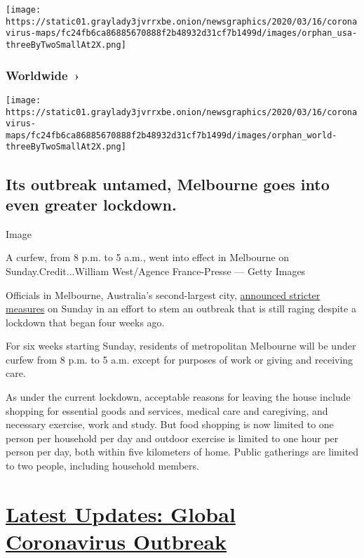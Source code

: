 \texttt{[image: https://static01.graylady3jvrrxbe.onion/newsgraphics/2020/03/16/coronavirus-maps/fc24fb6ca86885670888f2b48932d31cf7b1499d/images/orphan\_usa-threeByTwoSmallAt2X.png]}

\href{https://www.nytimes3xbfgragh.onion/interactive/2020/world/coronavirus-maps.html}{}

\hypertarget{worldwide-}{%
\subsubsection{Worldwide~›}\label{worldwide-}}

\texttt{[image: https://static01.graylady3jvrrxbe.onion/newsgraphics/2020/03/16/coronavirus-maps/fc24fb6ca86885670888f2b48932d31cf7b1499d/images/orphan\_world-threeByTwoSmallAt2X.png]}

\hypertarget{its-outbreak-untamed-melbourne-goes-into-even-greater-lockdown}{%
\subsection{Its outbreak untamed, Melbourne goes into even greater
lockdown.}\label{its-outbreak-untamed-melbourne-goes-into-even-greater-lockdown}}

Image

A curfew, from 8 p.m. to 5 a.m., went into effect in Melbourne on
Sunday.Credit...William West/Agence France-Presse --- Getty Images

Officials in Melbourne, Australia's second-largest city,
\href{https://www.premier.vic.gov.au/statement-changes-melbournes-restrictions}{announced
stricter measures} on Sunday in an effort to stem an outbreak that is
still raging despite a lockdown that began four weeks ago.

For six weeks starting Sunday, residents of metropolitan Melbourne will
be under curfew from 8 p.m. to 5 a.m. except for purposes of work or
giving and receiving care.

As under the current lockdown, acceptable reasons for leaving the house
include shopping for essential goods and services, medical care and
caregiving, and necessary exercise, work and study. But food shopping is
now limited to one person per household per day and outdoor exercise is
limited to one hour per person per day, both within five kilometers of
home. Public gatherings are limited to two people, including household
members.

\hypertarget{latest-updates-global-coronavirus-outbreak}{%
\section{\texorpdfstring{\href{https://www.nytimes3xbfgragh.onion/2020/08/01/world/coronavirus-covid-19.html?action=click\&pgtype=Article\&state=default\&region=MAIN_CONTENT_1\&context=storylines_live_updates}{Latest
Updates: Global Coronavirus
Outbreak}}{Latest Updates: Global Coronavirus Outbreak}}\label{latest-updates-global-coronavirus-outbreak}}

